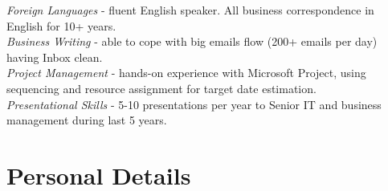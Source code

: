 \documentclass[10pt]{article} %
\begin{document}

{
\textit{Foreign Languages} - fluent English speaker. All business correspondence in English for 10+ years.\\
\textit{Business Writing} - able to cope with big emails flow (200+ emails per day) having Inbox clean. \\
\textit{Project Management} - hands-on experience with Microsoft Project, using sequencing and resource assignment for target date estimation.\\
\textit{Presentational Skills} - 5-10 presentations per year to Senior IT and business management during last 5 years.
}


\section{Personal Details}

\end{document}
